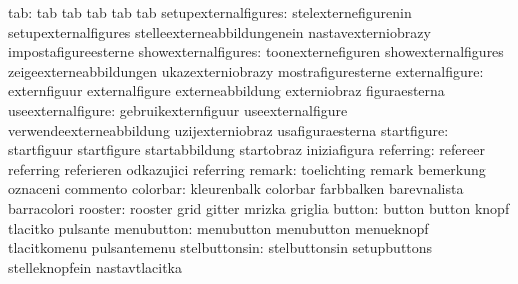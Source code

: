                              tab: tab                              tab
                                  tab                              tab
                                  tab
            setupexternalfigures: stelexternefigurenin             setupexternalfigures
                                  stelleexterneabbildungenein      nastavexterniobrazy
                                  impostafigureesterne
             showexternalfigures: toonexternefiguren               showexternalfigures
                                  zeigeexterneabbildungen          ukazexterniobrazy
                                  mostrafiguresterne
                  externalfigure: externfiguur                     externalfigure
                                  externeabbildung                 externiobraz
                                  figuraesterna
               useexternalfigure: gebruikexternfiguur              useexternalfigure
                                  verwendeexterneabbildung         uzijexterniobraz
                                  usafiguraesterna
                     startfigure: startfiguur                      startfigure
                                  startabbildung                   startobraz
                                  iniziafigura
                       referring: refereer                         referring
                                  referieren                       odkazujici
                                  referring                        %
                          remark: toelichting                      remark
                                  bemerkung                        oznaceni
                                  commento
                        colorbar: kleurenbalk                      colorbar
                                  farbbalken                       barevnalista
                                  barracolori
                         rooster: rooster                          grid
                                  gitter                           mrizka
                                  griglia
                          button: button                           button
                                  knopf                            tlacitko
                                  pulsante
                      menubutton: menubutton                       menubutton
                                  menueknopf                       tlacitkomenu
                                  pulsantemenu
                   stelbuttonsin: stelbuttonsin                    setupbuttons
                                  stelleknopfein                   nastavtlacitka
